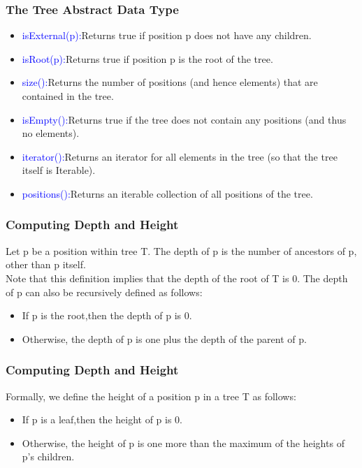 \documentclass[11pt]{beamer}
\begin{document}
      \begin{frame}
    	\frametitle{The Tree Abstract Data Type}
    	\begin{itemize}
    	\item \textcolor{blue}{isExternal(p):}Returns true if position p does not have any children.
    	\item \textcolor{blue}{isRoot(p):}Returns true if position p is the root of the tree.
    	\item \textcolor{blue}{size():}Returns the number of positions (and hence elements) that are contained in the tree.
    	\item \textcolor{blue}{isEmpty():}Returns true if the tree does not contain any positions (and thus no elements).
    	\item \textcolor{blue}{iterator():}Returns an iterator for all elements in the tree (so that the tree itself is Iterable).
    	\item \textcolor{blue}{positions():}Returns an iterable collection of all positions of the tree.
    	\end{itemize}
    \end{frame}

   \begin{frame}
  	\frametitle{Computing Depth and Height}
  	Let p be a position within tree T. The depth of p is the number of ancestors of p, other than p itself. \\
  	 Note that this definition implies that the depth of the root of T is 0. The depth of p can also be recursively defined as follows:
  	 \begin{itemize}
  	 	\item If p is the root,then the depth of p is 0.
  	 	\item Otherwise, the depth of p is one plus the depth of the parent of p.
  	 \end{itemize}
  \end{frame}

	\begin{frame}
		\frametitle{Computing Depth and Height}
	Formally, we define the height of a position p in a tree T as follows:
		\begin{itemize}
			\item  If p is a leaf,then the height of p is 0.
			\item Otherwise, the height of p is one more than the maximum of the heights of p’s children.
		\end{itemize}
	\end{frame}
\end{document}

